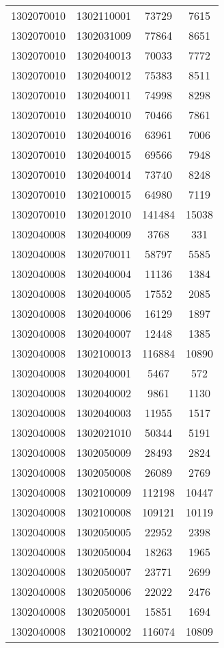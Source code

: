 \begin{longtable}[h]{llcc}
		1302070010 & 1302110001 & 73729 & 7615\\
		1302070010 & 1302031009 & 77864 & 8651\\
		1302070010 & 1302040013 & 70033 & 7772\\
		1302070010 & 1302040012 & 75383 & 8511\\
		1302070010 & 1302040011 & 74998 & 8298\\
		1302070010 & 1302040010 & 70466 & 7861\\
		1302070010 & 1302040016 & 63961 & 7006\\
		1302070010 & 1302040015 & 69566 & 7948\\
		1302070010 & 1302040014 & 73740 & 8248\\
		1302070010 & 1302100015 & 64980 & 7119\\
		1302070010 & 1302012010 & 141484 & 15038\\
		1302040008 & 1302040009 & 3768 & 331\\
		1302040008 & 1302070011 & 58797 & 5585\\
		1302040008 & 1302040004 & 11136 & 1384\\
		1302040008 & 1302040005 & 17552 & 2085\\
		1302040008 & 1302040006 & 16129 & 1897\\
		1302040008 & 1302040007 & 12448 & 1385\\
		1302040008 & 1302100013 & 116884 & 10890\\
		1302040008 & 1302040001 & 5467 & 572\\
		1302040008 & 1302040002 & 9861 & 1130\\
		1302040008 & 1302040003 & 11955 & 1517\\
		1302040008 & 1302021010 & 50344 & 5191\\
		1302040008 & 1302050009 & 28493 & 2824\\
		1302040008 & 1302050008 & 26089 & 2769\\
		1302040008 & 1302100009 & 112198 & 10447\\
		1302040008 & 1302100008 & 109121 & 10119\\
		1302040008 & 1302050005 & 22952 & 2398\\
		1302040008 & 1302050004 & 18263 & 1965\\
		1302040008 & 1302050007 & 23771 & 2699\\
		1302040008 & 1302050006 & 22022 & 2476\\
		1302040008 & 1302050001 & 15851 & 1694\\
		1302040008 & 1302100002 & 116074 & 10809\\

\end{longtable}
